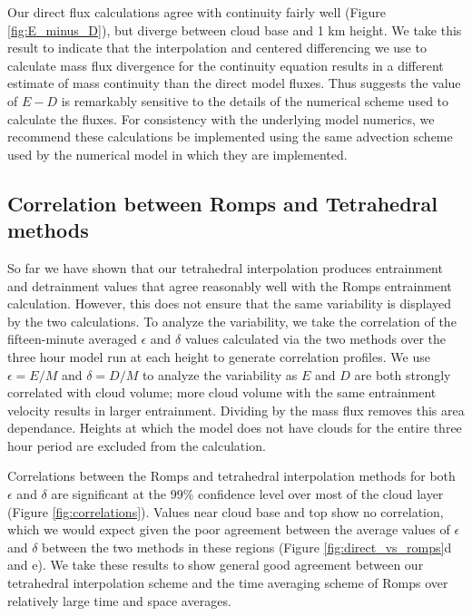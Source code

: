 \documentclass[12pt]{article}
\begin{document}
Our direct flux calculations agree with continuity fairly well 
(Figure \ref{fig:E_minus_D}), but diverge between cloud base and 1 km height.  
We take this result to indicate that the interpolation and centered 
differencing we use to calculate mass flux divergence for the continuity 
equation results in a different estimate of mass continuity than the direct 
model fluxes.  Thus suggests the value of $E-D$ is remarkably sensitive to 
the details of the numerical scheme used to calculate the fluxes.  For 
consistency with the underlying model numerics, we recommend these 
calculations be implemented using the same advection scheme used by the 
numerical model in which they are implemented.


\subsection{Correlation between Romps and Tetrahedral methods}

So far we have shown that our tetrahedral interpolation produces entrainment 
and detrainment values that agree reasonably well with the Romps entrainment
calculation.  However, this does not ensure that the same variability is 
displayed by the two calculations.  To analyze the variability, we take the 
correlation of the fifteen-minute averaged $\epsilon$ and $\delta$ values 
calculated via the two methods over the three hour model run at each height 
to generate correlation profiles.  We use $\epsilon = E/M$ and $\delta = D/M$ 
to analyze the variability as $E$ and $D$ are both strongly correlated with 
cloud volume; more cloud volume with the same entrainment velocity results in 
larger entrainment.  Dividing by the mass flux removes this area dependance.
Heights at which the model does not have clouds for the entire three hour 
period are excluded from the calculation.  

Correlations between the Romps and tetrahedral interpolation methods for both 
$\epsilon$ and $\delta$ are significant at the 99\% confidence level over most 
of the cloud layer (Figure \ref{fig:correlations}).  Values near cloud 
base and top show no correlation, which we would expect given the poor 
agreement between the average values of $\epsilon$ and $\delta$ between the 
two methods in these regions (Figure \ref{fig:direct_vs_romps}d and e).  We
take these results to show general good agreement between our tetrahedral 
interpolation scheme and the time averaging scheme of Romps over relatively 
large time and space averages.  
\end{document}
